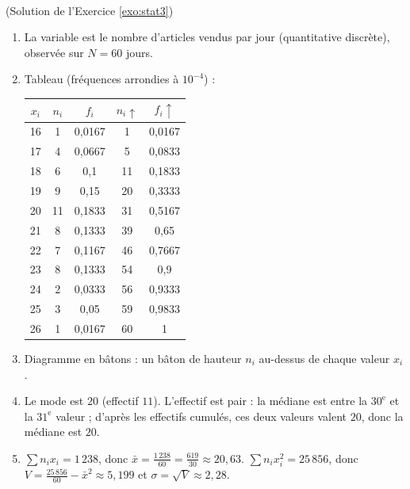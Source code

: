 \begin{corrige}
\begin{sol} ~ \\
(Solution de l'Exercice \ref{exo:stat3})
\begin{enumerate}
\item La variable est le nombre d'articles vendus par jour (quantitative discr\`ete), observ\'ee sur $N = 60$ jours.
\item Tableau (fr\'equences arrondies \`a $10^{-4}$) :
      \begin{center}
      \begin{tabular}{|c|c|c|c|c|}
      \hline
      $x_i$ & $n_i$ & $f_i$ & $n_i\uparrow$ & $f_i\uparrow$ \\
      \hline
      16 & 1 & 0,0167 & 1 & 0,0167 \\
      17 & 4 & 0,0667 & 5 & 0,0833 \\
      18 & 6 & 0,1 & 11 & 0,1833 \\
      19 & 9 & 0,15 & 20 & 0,3333 \\
      20 & 11 & 0,1833 & 31 & 0,5167 \\
      21 & 8 & 0,1333 & 39 & 0,65 \\
      22 & 7 & 0,1167 & 46 & 0,7667 \\
      23 & 8 & 0,1333 & 54 & 0,9 \\
      24 & 2 & 0,0333 & 56 & 0,9333 \\
      25 & 3 & 0,05 & 59 & 0,9833 \\
      26 & 1 & 0,0167 & 60 & 1 \\
      \hline
      \end{tabular}
      \end{center}
\item Diagramme en b\^atons : un b\^aton de hauteur $n_i$ au-dessus de chaque valeur $x_i$.
\item Le mode est $20$ (effectif $11$). L'effectif est pair : la m\'ediane est entre la $30^{\text{e}}$ et la $31^{\text{e}}$ valeur ;
      d'apr\`es les effectifs cumul\'es, ces deux valeurs valent $20$, donc la m\'ediane est $20$.
\item $\sum n_i x_i = 1\,238$, donc $\bar{x} = \frac{1\,238}{60} = \frac{619}{30} \approx 20,63$.
      $\sum n_i x_i^2 = 25\,856$, donc $V = \frac{25\,856}{60} - \bar{x}^2 \approx 5,199$ et $\sigma = \sqrt{V} \approx 2,28$.
\end{enumerate}
\end{sol}


\end{corrige}
